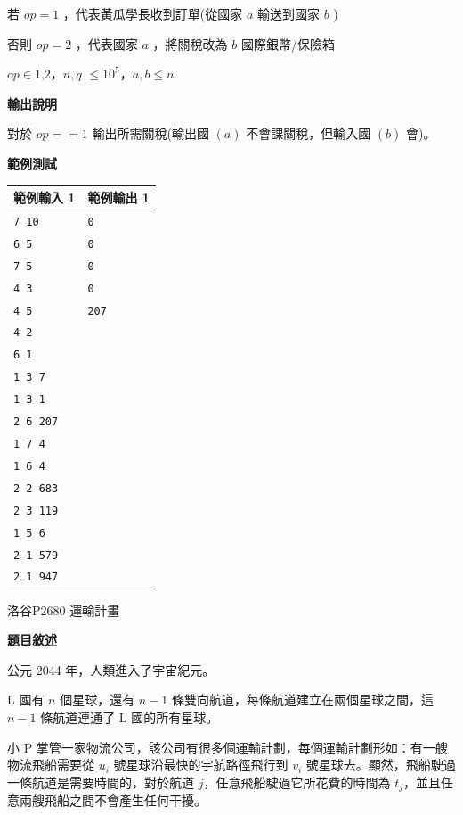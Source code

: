     若 $op=1$ ，代表黃瓜學長收到訂單(從國家 $a$ 輸送到國家 $b$ )
    
    否則 $op=2$ ，代表國家 $a$ ，將關稅改為 $b$ 國際銀幣/保險箱
    
    $op \in \text{{1,2}}$，$n,q$ $\leq 10^5$，$a,b \le n$

    \textbf{輸出說明}

    對於 $op==1$ 輸出所需關稅(輸出國 $(a)$ 不會課關稅，但輸入國 $(b)$ 會)。

    \textbf{範例測試}

    \begin{tabular}{|m{7cm}|m{7cm}|}
        \hline
        範例輸入 1 & 範例輸出 1 \\
        \hline
        \verb|7 10|  & \verb|0| \\
        \verb|6 5|   & \verb|0| \\
        \verb|7 5|   & \verb|0| \\
        \verb|4 3|   & \verb|0| \\
        \verb|4 5|   & \verb|207| \\
        \verb|4 2| & \\
        \verb|6 1| & \\
        \verb|1 3 7| & \\
        \verb|1 3 1| & \\
        \verb|2 6 207| & \\
        \verb|1 7 4| & \\
        \verb|1 6 4| & \\
        \verb|2 2 683| & \\
        \verb|2 3 119| &  \\
        \verb|1 5 6| &  \\
        \verb|2 1 579| &  \\
        \verb|2 1 947| & \\
        \hline
    \end{tabular}

    \problem 洛谷P2680 運輸計畫

    \textbf{題目敘述}

    公元 2044 年，人類進入了宇宙紀元。

    L 國有 $n$ 個星球，還有 $n-1$ 條雙向航道，每條航道建立在兩個星球之間，這 $n-1$ 條航道連通了 L 國的所有星球。

    小 P 掌管一家物流公司，該公司有很多個運輸計劃，每個運輸計劃形如：有一艘物流飛船需要從 $u_i$ 號星球沿最快的宇航路徑飛行到 $v_i$ 號星球去。顯然，飛船駛過一條航道是需要時間的，對於航道 $j$，任意飛船駛過它所花費的時間為 $t_j$，並且任意兩艘飛船之間不會產生任何干擾。

